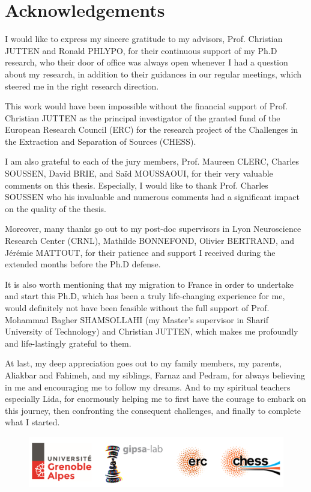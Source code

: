 \chapter*{Acknowledgements}



I would like to express my sincere gratitude to my advisors, Prof. Christian JUTTEN and Ronald PHLYPO, for their continuous support of my Ph.D research, who their door of office was always open whenever I had a question about my research, in addition to their guidances in our regular meetings, which steered me in the right research direction.

This work would have been impossible without the financial support of Prof. Christian JUTTEN as the principal investigator of the granted fund of the European Research Council (ERC) for the research project of the Challenges in the Extraction and Separation of Sources (CHESS).

I am also grateful to each of the jury members, Prof. Maureen CLERC, Charles SOUSSEN, David BRIE, and Sa\"{i}d MOUSSAOUI, for their very valuable comments on this thesis. Especially, I would like to thank Prof. Charles SOUSSEN who his invaluable and numerous comments 
had a significant impact on the quality of the thesis.

Moreover, many thanks go out to my post-doc supervisors in Lyon Neuroscience Research Center (CRNL), Mathilde BONNEFOND, Olivier BERTRAND, and Jérémie MATTOUT, for their patience and support I received during the extended 
months before the Ph.D defense. 

It is also worth mentioning that my migration to France in order to undertake and start this Ph.D, which has been a truly life-changing experience for me, would definitely not have been feasible without the full support of Prof. Mohammad Bagher SHAMSOLLAHI (my Master's supervisor in Sharif University of Technology) and Christian JUTTEN, which makes me profoundly and life-lastingly grateful to them.

At last, my deep appreciation goes out to my family members, my parents, Aliakbar and Fahimeh, and my siblings, Farnaz and Pedram, for always believing in me and encouraging me to follow my dreams. And to my spiritual teachers especially Lida, for enormously
helping me to first have the courage to embark on this journey, then confronting the consequent challenges, and finally to complete what I started. 

\begin{figure}%
\centering
\includegraphics[width=1\textwidth]{images/Logos.png} %
\end{figure}

